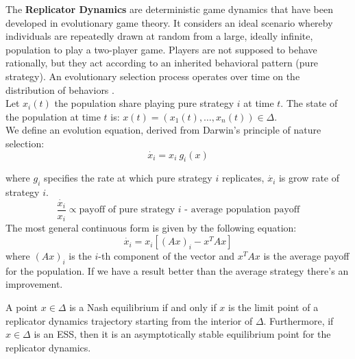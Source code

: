 The \textbf{Replicator Dynamics}  are deterministic game dynamics that have been developed in evolutionary game theory. It considers an ideal scenario whereby individuals are repeatedly drawn at random from a large, ideally infinite, population to play a two-player game. Players are not supposed to behave rationally, but they act according to an inherited behavioral pattern (pure strategy). An evolutionary selection process operates over time on the distribution of behaviors \cite{replicator}.\\

Let $x_i(t)$ the population share playing pure strategy $i$ at time $t$. The state of the population at time $t$ is: $x(t) = (x_1(t),\dots,x_n(t))\in\Delta$.\\
We define an evolution equation, derived from Darwin's principle of nature selection:
$$\dot{x_i} = x_i~g_i(x)$$

where $g_i$ specifies the rate at which pure strategy $i$ replicates, $\dot{x_i}$ is grow rate of strategy $i$. 
$$\frac{\dot{x_i}}{x_i} \propto \text{payoff of pure strategy }i\text{ - average population payoff}$$
The most general continuous form is given by the following equation:
$$\dot{x_i} = x_i[(Ax)_i - x^TAx]$$
where $(Ax)_i$ is the $i$-th component of the vector and $x^TAx$ is the average payoff for the population. If we have a result better than the average strategy there's an improvement.

\begin{thm}{}
A point $x\in\Delta$ is a Nash equilibrium if and only if $x$ is the limit point of a replicator dynamics trajectory starting from the interior of $\Delta$. Furthermore, if $x\in\Delta$ is an ESS, then it is an asymptotically stable equilibrium point for the replicator dynamics.\\
\end{thm}

